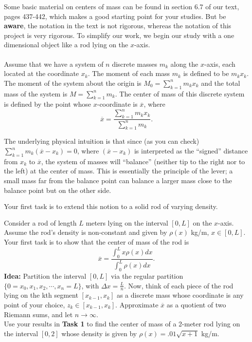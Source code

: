\documentclass[12pt,reqno]{amsart}
\numberwithin{equation}{section} \theoremstyle{plain}
\begin{document}
Some basic material on centers of mass can be found in section 6.7 of our text, pages
437-442, which makes a good starting point for your studies. But be {\bf aware}, 
the notation in the text is not rigorous, 
whereas the notation of this project is very rigorous. 
To simplify our work, we begin our study with a one dimensional object like a rod lying on the $x$-axis.\\

\\
Assume that we have a system of $n$ discrete masses $m_k$ along the $x$-axis, each located at the coordinate $x_k$. 
The moment of each mass $m_k$ is defined to be $m_k x_k$. The moment of the system about the origin is 
$M_0=\sum_{k=1}^n m_k x_k$ and the total mass of the system is $M=\sum_{k=1}^n m_k $.
The center of mass of this discrete system is defined by the point whose $x$-coordinate is $\overline{x}$, where
$$\overline{x}= \frac{\sum_{k=1}^n m_k x_k}{\sum_{k=1}^n m_k}.$$

The underlying physical intuition is that since (as you can check) $\sum_{k=1}^n m_k (\overline{x}-x_k)=0$,
where $(\overline{x}-x_k)$ is interpreted as the ``signed'' distance from $x_k$ to $\overline{x}$, 
the system of masses will ``balance'' (neither tip to the right nor to the left) at the center of mass.
This is essentially the principle of the lever; a small mass far from
the balance point can balance a larger mass close to the balance point but on the 
other side. 

Your first task is to extend this notion to a solid rod of varying density.

\smallskip

 Consider a rod of length $L$ meters lying on the interval $[0,L]$ on the  $x$-axis. 
Assume the rod's density is non-constant and given by $\rho (x)$ kg/m,  $x\in [0,L]$. Your first task 
is to show that the center of mass of the rod is 
$$\overline{x}= \frac{\int_{0}^L x \rho (x) dx}{\int_{0}^L  \rho (x) dx}.$$
{\bf Idea:} Partition the interval  $[0,L]$  via the regular partition  
$\{0=x_0, x_1, x_2,  \cdots , x_n=L\}$, with $\Delta x=\frac{L}{n}$. Now, think 
of each piece of the rod lying on the kth segment $[x_{k-1}, x_k]$ as a discrete 
mass whose coordinate is any point of your choice, $z_k \in [x_{k-1}, x_k] $.  
Approximate $\overline{x}$ as a quotient of two Riemann sums, and let  $n\rightarrow \infty$.\\

 Use your results in {\bf Task 1} to find the center of mass of a 
2-meter rod lying on the interval $[0,2]$ whose density is given by $\rho(x) =.01 \sqrt{x+1}$ kg/m. \\
\end{document}
